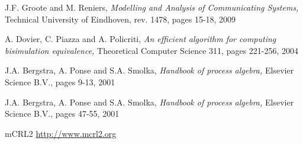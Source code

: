 \begin{thebibliography}{1}
J.F. Groote and M. Reniers, 
\emph{Modelling and Analysis of Communicating Systems}\emph, 
Technical University of Eindhoven, rev. 1478, pages 15-18, 2009

A. Dovier, C. Piazza and A. Policriti, 
\emph{An efficient algorithm for computing bisimulation equivalence}\emph, 
Theoretical Computer Science 311, pages 221-256, 2004

J.A. Bergstra, A. Ponse and S.A. Smolka, 
\emph{Handbook of process algebra}\emph, 
Elsevier Science B.V., pages 9-13, 2001

J.A. Bergstra, A. Ponse and S.A. Smolka, 
\emph{Handbook of process algebra}\emph, 
Elsevier Science B.V., pages 47-55, 2001

mCRL2
\newline \url{http://www.mcrl2.org}

\end{thebibliography}